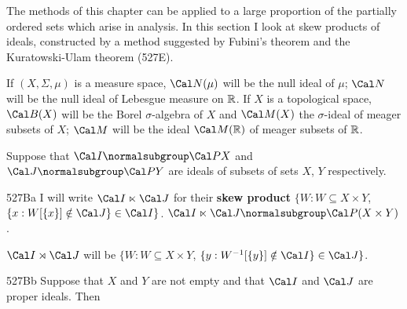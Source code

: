 
\def\chaptername{Cardinal functions of measure theory}
\def\sectionname{Skew products of ideals}

\def\CalMk{\Cal{M}\eurm{k}}
\def\CalSmz{\Cal{S}\eurm{mz}}
\def\rti{right-{\vthsp}translation-{\vthsp}invariant}


The methods of this chapter can be applied to a large proportion of the
partially ordered sets which arise in analysis.   In this section I
look at skew products of ideals,
constructed by a method suggested by Fubini's theorem and the
Kuratowski-Ulam theorem (527E).

 If $(X,\Sigma,\mu)$ is a measure space,
$\Cal N(\mu)$ will be the null ideal of $\mu$;
$\Cal N$ will be the null ideal of Lebesgue measure on $\Bbb R$.
If $X$ is a topological space, $\Cal B(X)$ will be the Borel
$\sigma$-algebra of $X$ and $\Cal M(X)$ the $\sigma$-ideal of meager
subsets of $X$;  $\Cal M$ will be the ideal
$\Cal M(\Bbb R)$ of meager subsets of $\Bbb R$.

 Suppose that
$\Cal I\normalsubgroup\Cal PX$ and $\Cal J\normalsubgroup\Cal PY$ are
ideals of subsets of sets $X$, $Y$ respectively.

\spheader 527Ba I will write $\Cal I\ltimes\Cal J$  for their
{\bf skew product}
$\{W:W\subseteq X\times Y$, $\{x:W[\{x\}]\notin\Cal J\}\in\Cal I\}$.
$\Cal I\ltimes\Cal J\normalsubgroup\Cal P(X\times Y)$.

$\Cal I\rtimes\Cal J$ will be
$\{W:W\subseteq X\times Y$, $\{y:W^{-1}[\{y\}]\notin\Cal I\}\in\Cal J\}$.

\spheader 527Bb Suppose that $X$ and $Y$ are not empty and that $\Cal I$
and $\Cal J$ are proper ideals.   Then



